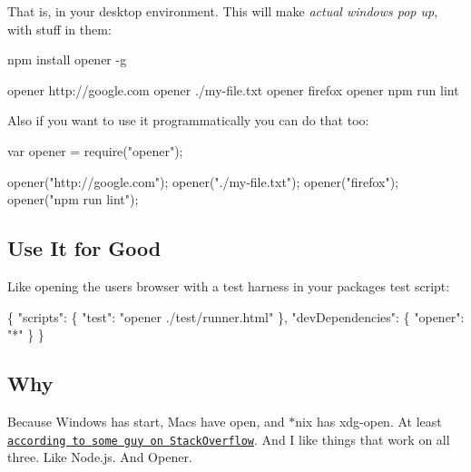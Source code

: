 That is, in your desktop environment. This will make {\itshape actual windows pop up}, with stuff in them\+:


\begin{DoxyCode}
npm install opener -g

opener http://google.com
opener ./my-file.txt
opener firefox
opener npm run lint
\end{DoxyCode}


Also if you want to use it programmatically you can do that too\+:


\begin{DoxyCode}
var opener = require("opener");

opener("http://google.com");
opener("./my-file.txt");
opener("firefox");
opener("npm run lint");
\end{DoxyCode}


\subsection*{Use It for Good}

Like opening the user\textquotesingle{}s browser with a test harness in your package\textquotesingle{}s test script\+:


\begin{DoxyCode}
\{
    "scripts": \{
        "test": "opener ./test/runner.html"
    \},
    "devDependencies": \{
        "opener": "*"
    \}
\}
\end{DoxyCode}


\subsection*{Why}

Because Windows has {\ttfamily start}, Macs have {\ttfamily open}, and $\ast$nix has {\ttfamily xdg-\/open}. At least \href{http://stackoverflow.com/q/1480971/3191}{\tt according to some guy on Stack\+Overflow}. And I like things that work on all three. Like Node.\+js. And Opener. 
